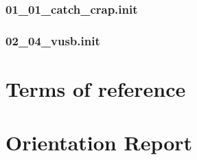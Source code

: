 \subsection{01\_01\_catch\_crap.init}
\scalebox{0.6}{

}

\subsection{02\_04\_vusb.init}
\label{sec:vusb_init}
\scalebox{0.6}{

}

\chapter{Terms of reference}
\label{sec:terms}


\chapter{Orientation Report}
\label{sec:orientation}

